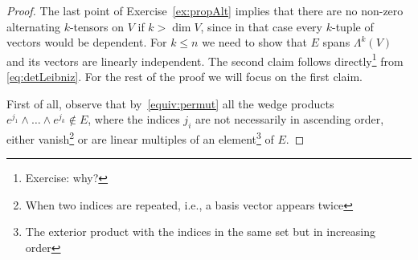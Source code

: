 \begin{proof}
	The last point of Exercise~\ref{ex:propAlt} implies that there are no non-zero alternating $k$-tensors on $V$ if $k >\dim V$, since in that case every $k$-tuple of vectors would be dependent.
	For $k\leq n$ we need to show that $E$ spans $\Lambda^k(V)$ and its vectors are linearly independent.
	The second claim follows directly\footnote{Exercise: why?} from \eqref{eq:detLeibniz}. For the rest of the proof we will focus on the first claim.

	First of all, observe that by~\eqref{equiv:permut} all the wedge products ${e^{j_1}\wedge\ldots\wedge e^{j_k}\not\in E}$, where the indices $j_i$ are not necessarily in ascending order, either vanish\footnote{When two indices are repeated, i.e., a basis vector appears twice} or are linear multiples of an element\footnote{The exterior product with the indices in the same set but in increasing order} of $E$.


\end{proof}

